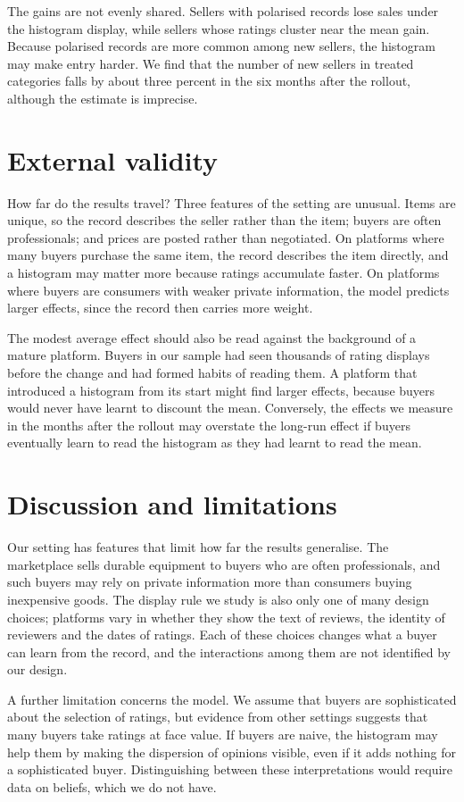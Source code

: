 \documentclass[12pt]{article}
\begin{document}
The gains are not evenly shared. Sellers with polarised records lose sales under the histogram display, while sellers whose ratings cluster near the mean gain. Because polarised records are more common among new sellers, the histogram may make entry harder. We find that the number of new sellers in treated categories falls by about three percent in the six months after the rollout, although the estimate is imprecise.

\section{External validity}
How far do the results travel? Three features of the setting are unusual. Items are unique, so the record describes the seller rather than the item; buyers are often professionals; and prices are posted rather than negotiated. On platforms where many buyers purchase the same item, the record describes the item directly, and a histogram may matter more because ratings accumulate faster. On platforms where buyers are consumers with weaker private information, the model predicts larger effects, since the record then carries more weight.

The modest average effect should also be read against the background of a mature platform. Buyers in our sample had seen thousands of rating displays before the change and had formed habits of reading them. A platform that introduced a histogram from its start might find larger effects, because buyers would never have learnt to discount the mean. Conversely, the effects we measure in the months after the rollout may overstate the long-run effect if buyers eventually learn to read the histogram as they had learnt to read the mean.

\section{Discussion and limitations}
Our setting has features that limit how far the results generalise. The marketplace sells durable equipment to buyers who are often professionals, and such buyers may rely on private information more than consumers buying inexpensive goods. The display rule we study is also only one of many design choices; platforms vary in whether they show the text of reviews, the identity of reviewers and the dates of ratings. Each of these choices changes what a buyer can learn from the record, and the interactions among them are not identified by our design.

A further limitation concerns the model. We assume that buyers are sophisticated about the selection of ratings, but evidence from other settings suggests that many buyers take ratings at face value. If buyers are naive, the histogram may help them by making the dispersion of opinions visible, even if it adds nothing for a sophisticated buyer. Distinguishing between these interpretations would require data on beliefs, which we do not have.
\end{document}
